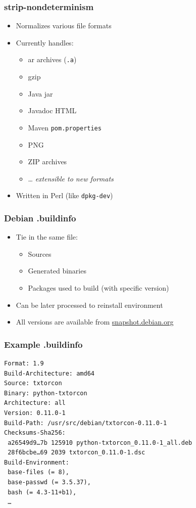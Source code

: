\documentclass[14pt,aspectratio=169]{beamer}
\begin{document}
\begin{frame}
 \frametitle{strip-nondeterminism}

 \begin{itemize}
  \item Normalizes various file formats
  \item Currently handles:
   \begin{itemize}
    \item ar archives (\texttt{.a})
    \item gzip
    \item Java jar
    \item Javadoc HTML
    \item Maven \texttt{pom.properties}
    \item PNG
    \item ZIP archives
    \item … \textit{extensible to new formats}
   \end{itemize}
  \item Written in Perl (like \texttt{dpkg-dev})
 \end{itemize}
\end{frame}

\begin{frame}
 \frametitle{Debian .buildinfo}

 \begin{itemize}
  \item Tie in the same file:
   \begin{itemize}
    \item Sources
    \item Generated binaries
    \item Packages used to build (with specific version)
   \end{itemize}
  \item Can be later processed to reinstall environment
  \item All versions are available from \url{snapshot.debian.org}
 \end{itemize}
\end{frame}

\begin{frame}[fragile]
 \frametitle{Example .buildinfo}

{\small
\begin{verbatim}
Format: 1.9
Build-Architecture: amd64
Source: txtorcon
Binary: python-txtorcon
Architecture: all
Version: 0.11.0-1
Build-Path: /usr/src/debian/txtorcon-0.11.0-1
Checksums-Sha256:
 a26549d9…7b 125910 python-txtorcon_0.11.0-1_all.deb
 28f6bcbe…69 2039 txtorcon_0.11.0-1.dsc
Build-Environment:
 base-files (= 8),
 base-passwd (= 3.5.37),
 bash (= 4.3-11+b1),
 …
\end{verbatim}
}
\end{frame}
\end{document}
